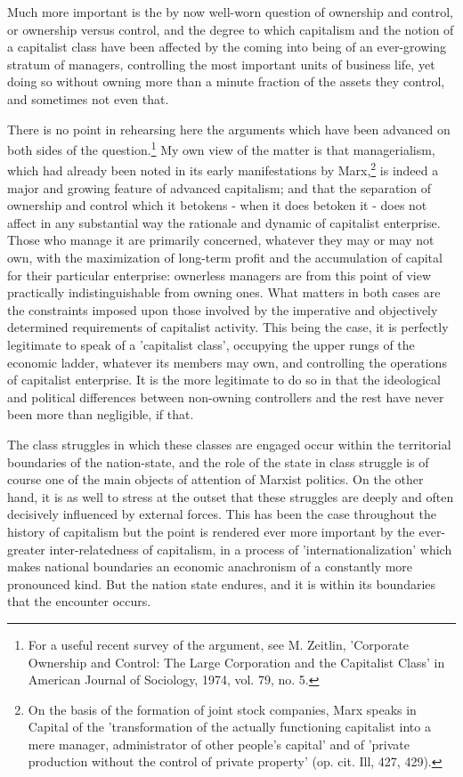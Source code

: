 Much more important is the by now well-worn question of ownership and control, or ownership versus control, and the degree to which capitalism and the notion of a capitalist class have been affected by the coming into being of an ever-growing stratum of managers, controlling the most important units of business life, yet doing so without owning more than a minute fraction of the assets they control, and sometimes not even that.

There is no point in rehearsing here the arguments which have been advanced on both sides of the question.\footnote{For a useful recent survey of the argument, see M. Zeitlin, 'Corporate Ownership and Control: The Large Corporation and the Capitalist Class' in American Journal of Sociology, 1974, vol. 79, no. 5.} My own view of the matter is that managerialism, which had already been noted in its early manifestations by Marx,\footnote{On the basis of the formation of joint stock companies, Marx speaks in Capital of the 'transformation of the actually functioning capitalist into a mere manager, administrator of other people's capital' and of 'private production without the control of private property' (op. cit. Ill, 427, 429).} is indeed a major and growing feature of advanced capitalism; and that the separation of ownership and control which it betokens - when it does betoken it - does not affect in any substantial way the rationale and dynamic of capitalist enterprise. Those who manage it are primarily concerned, whatever they may or may not own, with the maximization of long-term profit and the accumulation of capital for their particular enterprise: ownerless managers are from this point of view practically indistinguishable from owning ones. What matters in both cases are the constraints imposed upon those involved by the imperative and objectively determined requirements of capitalist activity. This being the case, it is perfectly legitimate to speak of a 'capitalist class', occupying the upper rungs of the economic ladder, whatever its members may own, and controlling the operations of capitalist enterprise. It is the more legitimate to do so in that the ideological and political differences between non-owning controllers and the rest have never been more than negligible, if that.

The class struggles in which these classes are engaged occur within the territorial boundaries of the nation-state, and the role of the state in class struggle is of course one of the main objects of attention of Marxist politics. On the other hand, it is as well to stress at the outset that these struggles are deeply and often decisively influenced by external forces. This has been the case throughout the history of capitalism but the point is rendered ever more important by the ever-greater inter\hyp{}relatedness of capitalism, in a process of 'internationalization' which makes national boundaries an economic anachronism of a constantly more pronounced kind. But the nation state endures, and it is within its boundaries that the encounter occurs.

